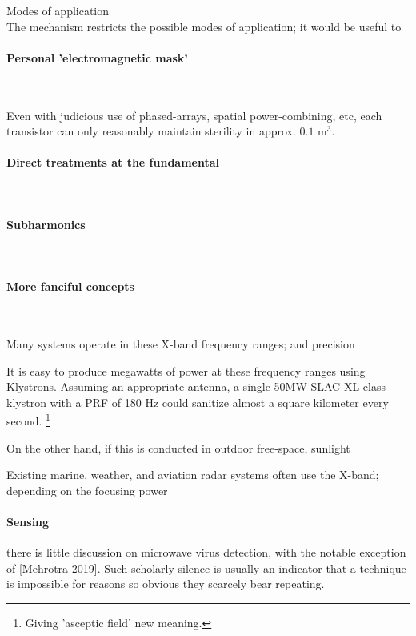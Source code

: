 \documentclass[fleqn,10pt]{article}
\begin{document}
\clearpage
\begin{multicols}{1}
{\Large Modes of application}\\

The mechanism restricts the possible modes of application; it would be useful to 

\paragraph{\textbf{Personal 'electromagnetic mask'}}\

Even with judicious use of phased-arrays, spatial power-combining, etc, each transistor can only reasonably maintain sterility in approx. $ 0.1 \text{ m}^3 $.

\paragraph{\textbf{Direct treatments at the fundamental}}\



\paragraph{\textbf{Subharmonics}}\


\paragraph{\textbf{More fanciful concepts}}\

Many systems operate in these X-band frequency ranges; and precision 

It is easy to produce megawatts of power at these frequency ranges using Klystrons. Assuming an appropriate antenna, a single 50MW SLAC XL-class klystron with a PRF of 180 Hz could sanitize almost a square kilometer every second. \footnote{Giving 'asceptic field' new meaning.}

On the other hand, if this is conducted in outdoor free-space, sunlight

Existing marine, weather, and aviation radar systems often use the X-band; depending on the focusing power

\paragraph{Sensing}

there is little discussion on microwave virus detection, with the notable exception of [Mehrotra 2019]. Such scholarly silence is usually an indicator that a technique is impossible for reasons so obvious they scarcely bear repeating. 


\end{multicols}
\end{document}
